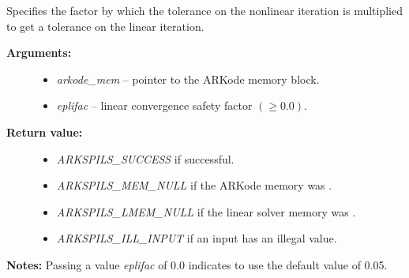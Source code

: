 \documentclass[letterpaper,10pt,english]{sphinxmanual}
\begin{document}

\begin{fulllineitems}
\label{c_interface/User_callable:c.ARKSpilsSetEpsLin}
Specifies the factor by which the tolerance on the nonlinear
iteration is multiplied to get a tolerance on the linear
iteration.
\begin{description}
\item[{\textbf{Arguments:}}] \leavevmode\begin{itemize}
\item {} 
\emph{arkode\_mem} -- pointer to the ARKode memory block.

\item {} 
\emph{eplifac} -- linear convergence safety factor \((\ge 0.0)\).

\end{itemize}

\item[{\textbf{Return value:}}] \leavevmode\begin{itemize}
\item {} 
\emph{ARKSPILS\_SUCCESS} if successful.

\item {} 
\emph{ARKSPILS\_MEM\_NULL} if the ARKode memory was .

\item {} 
\emph{ARKSPILS\_LMEM\_NULL} if the linear solver memory was .

\item {} 
\emph{ARKSPILS\_ILL\_INPUT} if an input has an illegal value.

\end{itemize}

\end{description}

\textbf{Notes:} Passing a value \emph{eplifac} of 0.0 indicates to use the default value of 0.05.

\end{fulllineitems}

\end{document}
